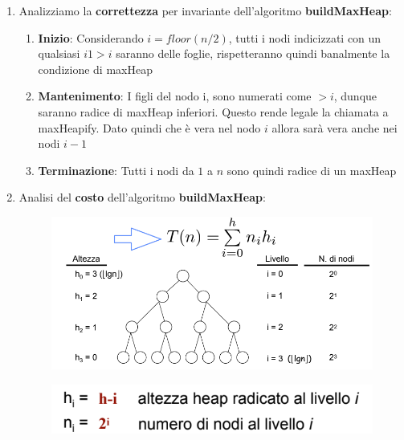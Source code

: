 \documentclass{article}
\begin{document}
\begin{enumerate}
    \item Analizziamo la \textbf{correttezza} per invariante dell'algoritmo \textbf{buildMaxHeap}:
    \begin{enumerate}
        \item \textbf{Inizio}: Considerando $i=floor(n/2)$, tutti i nodi indicizzati con un qualsiasi
        $i1>i$  saranno delle foglie, rispetteranno quindi banalmente la condizione di maxHeap
        \item \textbf{Mantenimento}: I figli del nodo i, sono numerati come $>i$, dunque saranno radice di maxHeap inferiori. Questo rende legale la chiamata a maxHeapify. Dato quindi che è vera nel nodo $i$ allora sarà vera anche nei nodi $i-1$
        \item \textbf{Terminazione}: Tutti i nodi da $1$ a $n$ sono quindi radice di un maxHeap
    \end{enumerate}

    \item Analisi del \textbf{costo} dell'algoritmo \textbf{buildMaxHeap}:

    \begin{figure}[htbp]
        \center
        \includegraphics[scale=0.5]{img/costoHeap1.png}
    \end{figure}

    \begin{figure}[htbp]
        \center
        \includegraphics[scale=0.4]{img/costoHeap2.png}
    \end{figure}


\end{enumerate}
\end{document}
